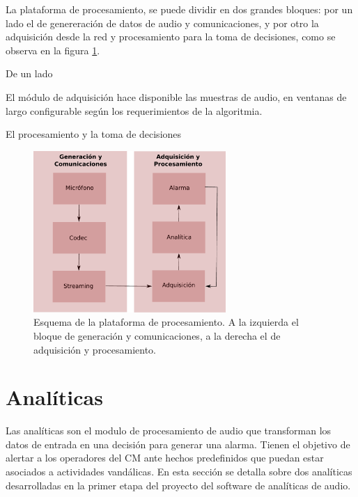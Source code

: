 \documentclass{article}
\begin{document}
La plataforma de procesamiento, se puede dividir en dos grandes bloques: por un lado el de genereración de datos de audio y comunicaciones, y por otro la adquisición desde la red y procesamiento para la toma de decisiones, como se observa en la figura \ref{fig:plataforma_procesamiento}.

De un lado 

El módulo de adquisición hace disponible las muestras de audio, en ventanas de largo configurable según los requerimientos de la algoritmia.

El procesamiento y la toma de decisiones 

\begin{figure}[h]
\begin{center}
\includegraphics[width=0.65\textwidth]{plataforma_procesamiento} 
\caption{Esquema de la plataforma de procesamiento. A la izquierda el bloque de generación y comunicaciones, a la derecha el de adquisición y procesamiento.}
\label{fig:plataforma_procesamiento}
\end{center}
\end{figure}


\section{Analíticas}
Las analíticas son el modulo de procesamiento de audio que transforman los datos de entrada en una decisión para generar una alarma. Tienen el objetivo de alertar a los operadores del CM ante hechos predefinidos que puedan estar asociados a actividades vandálicas. En esta sección se detalla sobre dos analíticas desarrolladas en la primer etapa del proyecto del software de analíticas de audio. 
\end{document}

